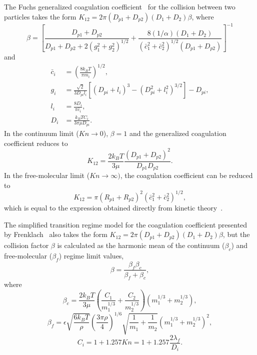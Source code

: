 \documentclass[preprint,letterpaper]{elsarticle}
\begin{document}
The Fuchs generalized coagulation coefficient~\cite{Fuchs_1964} for the collision between two particles takes the form $K_{12}=2\pi (D_{p1}+D_{p2})(D_1+D_2)\beta$, where
\begin{equation}
    \beta = \left[ \frac{D_{p1}+D_{p2}}{D_{p1}+D_{p2}+2(g_1^2+g_2^2)^{1/2}} + \frac{8(1/\alpha)(D_1+D_2)}{(\bar{c}_1^2+\bar{c}_2^2)^{1/2}(D_{p1}+D_{p2})} \right]^{-1}
\end{equation}
and
\begin{align}
    \bar{c}_i &= \left( \frac{8k_B T}{\pi m_i} \right)^{1/2}, \\
    g_i &= \frac{\sqrt{2}}{3D_{pi}l_i} \left[ (D_{pi}+l_i)^3 - (D_{pi}^2+l_i^2)^{3/2} \right] - D_{pi}, \\
    l_i &= \frac{8D_i}{\pi \bar{c}_i}, \\
    D_i &= \frac{k_B T C_i}{3\pi \mu D_{pi}}.
\end{align}
In the continuum limit ($Kn \rightarrow 0$), $\beta=1$ and the generalized coagulation coefficient reduces to
\begin{equation}
    K_{12}=\frac{2k_BT}{3\mu} \frac{(D_{p1}+D_{p2})^2}{D_{p1}D_{p2}}.
\end{equation}
In the free-molecular limit ($Kn \rightarrow \infty)$, the coagulation coefficient can be reduced to
\begin{equation}
    K_{12} = \pi (R_{p1}+R_{p2})^2 (\bar{c}_1^2 + \bar{c}_2^2)^{1/2},
\end{equation}
which is equal to the expression obtained directly from kinetic theory~\cite{Seinfeld_2016}.

The simplified transition regime model for the coagulation coefficient presented by Frenklach~\cite{Frenklach_2002b} also takes the form $K_{12}=2\pi (D_{p1}+D_{p2})(D_1+D_2)\beta$, but the collision factor $\beta$ is calculated as the harmonic mean of the continuum ($\beta_c$) and free-molecular ($\beta_f$) regime limit values,
\begin{equation}
    \beta = \frac{\beta_f \beta_c}{\beta_f + \beta_c},
\end{equation}
where
\begin{equation}
    \beta_c = \frac{2k_BT}{3 \mu} \left( \frac{C_1}{m_1^{1/3}} + \frac{C_2}{m_2^{1/3}} \right) (m_1^{1/3}+m_2^{1/3}),
\end{equation}
\begin{equation}
    \beta_f = \epsilon \sqrt{\frac{6k_BT}{\rho}} \left( \frac{3\pi \rho}{4} \right)^{1/6} \sqrt{\frac{1}{m_1}+\frac{1}{m_2}} (m_1^{1/3}+m_2^{1/3})^2,
\end{equation}
\begin{equation}
    C_i = 1 + 1.257Kn = 1 + 1.257 \frac{2\lambda_f}{D_i}.
\end{equation}
\end{document}

